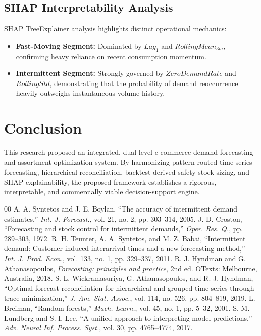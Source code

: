 \documentclass[conference]{IEEEtran}
\begin{document}
\subsection{SHAP Interpretability Analysis}
SHAP TreeExplainer analysis highlights distinct operational mechanics:
\begin{itemize}
    \item \textbf{Fast-Moving Segment:} Dominated by $Lag_1$ and $RollingMean_{3m}$, confirming heavy reliance on recent consumption momentum.
    \item \textbf{Intermittent Segment:} Strongly governed by $ZeroDemandRate$ and $RollingStd$, demonstrating that the probability of demand reoccurrence heavily outweighs instantaneous volume history.
\end{itemize}

\section{Conclusion}
This research proposed an integrated, dual-level e-commerce demand forecasting and assortment optimization system. By harmonizing pattern-routed time-series forecasting, hierarchical reconciliation, backtest-derived safety stock sizing, and SHAP explainability, the proposed framework establishes a rigorous, interpretable, and commercially viable decision-support engine.

\begin{thebibliography}{00}
 A. A. Syntetos and J. E. Boylan, ``The accuracy of intermittent demand estimates,'' \textit{Int. J. Forecast.}, vol. 21, no. 2, pp. 303--314, 2005.
 J. D. Croston, ``Forecasting and stock control for intermittent demands,'' \textit{Oper. Res. Q.}, pp. 289--303, 1972.
 R. H. Teunter, A. A. Syntetos, and M. Z. Babai, ``Intermittent demand: Customer-induced interarrival times and a new forecasting method,'' \textit{Int. J. Prod. Econ.}, vol. 133, no. 1, pp. 329--337, 2011.
 R. J. Hyndman and G. Athanasopoulos, \textit{Forecasting: principles and practice}, 2nd ed. OTexts: Melbourne, Australia, 2018.
 S. L. Wickramasuriya, G. Athanasopoulos, and R. J. Hyndman, ``Optimal forecast reconciliation for hierarchical and grouped time series through trace minimization,'' \textit{J. Am. Stat. Assoc.}, vol. 114, no. 526, pp. 804--819, 2019.
 L. Breiman, ``Random forests,'' \textit{Mach. Learn.}, vol. 45, no. 1, pp. 5--32, 2001.
 S. M. Lundberg and S. I. Lee, ``A unified approach to interpreting model predictions,'' \textit{Adv. Neural Inf. Process. Syst.}, vol. 30, pp. 4765--4774, 2017.
\end{thebibliography}
\end{document}
